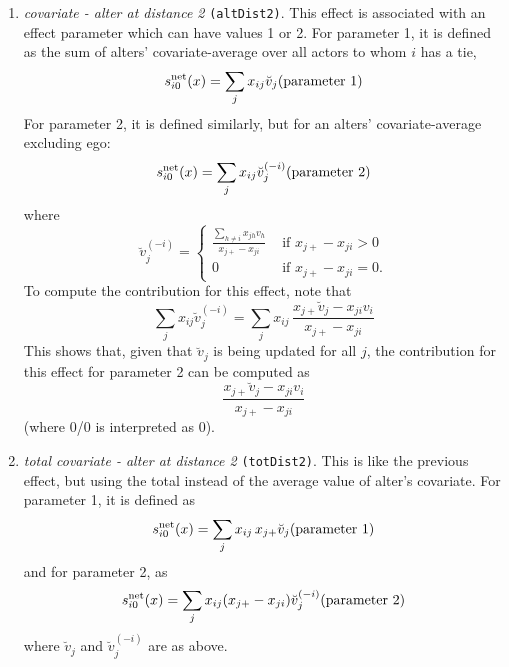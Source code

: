 \documentclass[a4paper,fleqn,11pt]{article}
\newcommand{\+}{\, + \,}
\newcommand{\vit}{\theenumi}
\newcounter{savenumi}
\begin{document}
\begin{enumerate}
\setcounter{enumi}{\value{savenumi}}

\item \emph{covariate - alter at distance 2} \texttt{(altDist2)}.
      This effect is associated with an effect parameter
      which can have values 1 or 2.
      For parameter 1, it is
      defined as the sum of alters' covariate-average over all actors
      to whom $i$ has a tie,
\[
 s^{\rm net}_{i\vit}(x) = \sum_j x_{ij} \breve v_j \hfill
            (\text{parameter 1}) \hfill
\]
      For parameter 2, it is defined similarly,
      but for an alters' covariate-average excluding
      ego:
\[
 s^{\rm net}_{i\vit}(x) = \sum_j x_{ij} \breve v_j^{(-i)} \hfill
                          (\text{parameter 2}) \hfill
\]
      where
\begin{equation}
  \breve v_j^{(-i)} = \left\{\begin{array}{ll} \displaystyle
         \frac{\sum_{h \neq i} x_{jh}v_h}{x_{j+} - x_{ji}}  &
                                       \text{ if } x_{j+} - x_{ji} > 0     \\
         0                                &  \text{ if } x_{j+}- x_{ji} = 0  .
  \end{array}   \right.            \label{alt_av2}
\end{equation}
      To compute the contribution for this effect, note that
\[
 \sum_j x_{ij} \breve v_j^{(-i)} = \sum_j x_{ij} \,
                      \frac{x_{j+} \breve v_j - x_{ji}v_i}{x_{j+}-x_{ji}}
\]
      This shows that, given that $\breve v_j$ is being updated for all $j$,
      the contribution for this effect for parameter 2 can be computed as
      \[
       \frac{x_{j+} \breve v_j - x_{ji}v_i}{x_{j+}-x_{ji}}
      \]
      (where 0/0 is interpreted as 0).


\item \emph{total covariate - alter at distance 2} \texttt{(totDist2)}.
      This is like the previous effect, but using the total
      instead of the average value of alter's covariate.
      For parameter 1, it is  defined as
\[
 s^{\rm net}_{i\vit}(x) = \sum_j x_{ij} \, x_{j+}\breve v_j \hfill
            (\text{parameter 1}) \hfill
\]
      and for parameter 2, as
\[
 s^{\rm net}_{i\vit}(x) = \sum_j x_{ij} (x_{j+} - x_{ji}) \breve v_j^{(-i)} \hfill
                          (\text{parameter 2}) \hfill
\]
      where $\breve v_j$ and $\breve v_j^{(-i)}$ are as above.


\end{enumerate}
\end{document}

